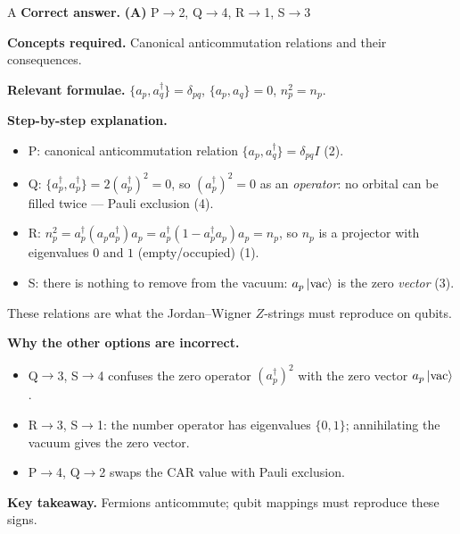 \documentclass[11pt,a4paper]{article}
\newcommand{\qsep}{\par\vspace{2pt}{\color{black!15}\hrule}\vspace{4pt}}
\begin{document}
\begin{solbox}{A}
\textbf{\color{brand}Correct answer.} \textcolor{okgreen}{\textbf{(A)}} P$\to$2, Q$\to$4, R$\to$1, S$\to$3

\textbf{\color{brand}Concepts required.} Canonical anticommutation relations and their consequences.

\textbf{\color{brand}Relevant formulae.} $\{a_p, a_q^\dagger\} = \delta_{pq}$, $\{a_p, a_q\} = 0$, $n_p^2 = n_p$.

\textbf{\color{brand}Step-by-step explanation.} \begin{itemize}\itemsep0pt
\item P: canonical anticommutation relation $\{a_p, a_q^\dagger\} = \delta_{pq}I$ (2).
\item Q: $\{a_p^\dagger, a_p^\dagger\} = 2(a_p^\dagger)^2 = 0$, so $(a_p^\dagger)^2 = 0$ as an \emph{operator}: no orbital can be filled twice --- Pauli exclusion (4).
\item R: $n_p^2 = a_p^\dagger(a_pa_p^\dagger)a_p = a_p^\dagger(1 - a_p^\dagger a_p)a_p = n_p$, so $n_p$ is a projector with eigenvalues $0$ and $1$ (empty/occupied) (1).
\item S: there is nothing to remove from the vacuum: $a_p\ket{\mathrm{vac}}$ is the zero \emph{vector} (3).
\end{itemize}
These relations are what the Jordan--Wigner $Z$-strings must reproduce on qubits.

\textbf{\color{brand}Why the other options are incorrect.}
\begin{itemize}[leftmargin=2.4em, itemsep=1pt, topsep=2pt]
\item[\textbf{(B)}] Q$\to$3, S$\to$4 confuses the zero operator $(a_p^\dagger)^2$ with the zero vector $a_p\ket{\mathrm{vac}}$.
\item[\textbf{(C)}] R$\to$3, S$\to$1: the number operator has eigenvalues $\{0, 1\}$; annihilating the vacuum gives the zero vector.
\item[\textbf{(D)}] P$\to$4, Q$\to$2 swaps the CAR value with Pauli exclusion.
\end{itemize}
\textbf{\color{brand}Key takeaway.} Fermions anticommute; qubit mappings must reproduce these signs.
\end{solbox}
\qsep
\end{document}
